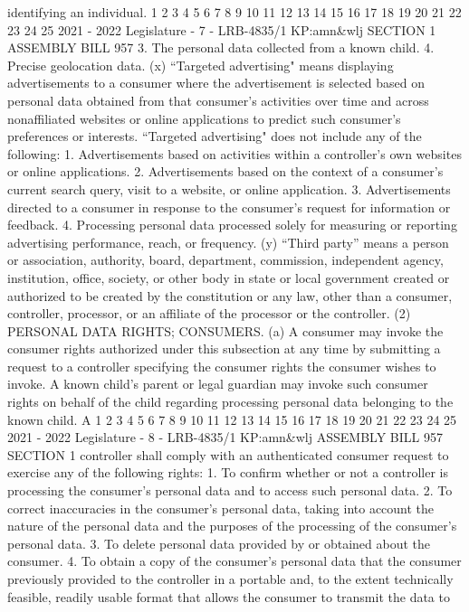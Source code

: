 identifying an individual.
1
2
3
4
5
6
7
8
9
10
11
12
13
14
15
16
17
18
19
20
21
22
23
24
25
2021 - 2022 Legislature - 7 - LRB-4835/1
KP:amn&wlj
SECTION 1 ASSEMBLY BILL 957
3. The personal data collected from a known child.
4. Precise geolocation data.
(x) “Targeted advertising" means displaying advertisements to a consumer
where the advertisement is selected based on personal data obtained from that
consumer's activities over time and across nonaffiliated websites or online
applications to predict such consumer's preferences or interests. “Targeted
advertising" does not include any of the following:
1. Advertisements based on activities within a controller's own websites or
online applications.
2. Advertisements based on the context of a consumer's current search query,
visit to a website, or online application.
3. Advertisements directed to a consumer in response to the consumer's request
for information or feedback.
4. Processing personal data processed solely for measuring or reporting
advertising performance, reach, or frequency.
(y) “Third party” means a person or association, authority, board, department,
commission, independent agency, institution, office, society, or other body in state or
local government created or authorized to be created by the constitution or any law,
other than a consumer, controller, processor, or an affiliate of the processor or the
controller.
(2) PERSONAL DATA RIGHTS; CONSUMERS. (a) A consumer may invoke the
consumer rights authorized under this subsection at any time by submitting a
request to a controller specifying the consumer rights the consumer wishes to invoke.
A known child's parent or legal guardian may invoke such consumer rights on behalf
of the child regarding processing personal data belonging to the known child. A
1
2
3
4
5
6
7
8
9
10
11
12
13
14
15
16
17
18
19
20
21
22
23
24
25
2021 - 2022 Legislature - 8 - LRB-4835/1
KP:amn&wlj
 ASSEMBLY BILL 957 SECTION 1
controller shall comply with an authenticated consumer request to exercise any of
the following rights:
1. To confirm whether or not a controller is processing the consumer's personal
data and to access such personal data.
2. To correct inaccuracies in the consumer's personal data, taking into account
the nature of the personal data and the purposes of the processing of the consumer's
personal data.
3. To delete personal data provided by or obtained about the consumer.
4. To obtain a copy of the consumer's personal data that the consumer
previously provided to the controller in a portable and, to the extent technically
feasible, readily usable format that allows the consumer to transmit the data to
